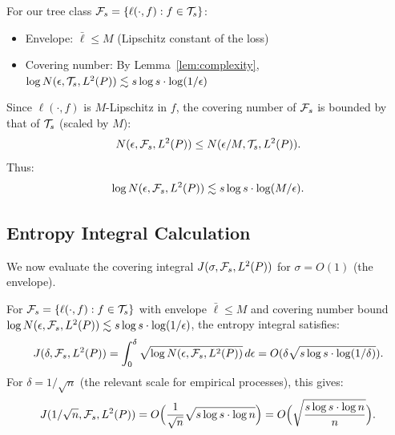 \documentclass[12pt]{article}
\begin{document}
For our tree class $\mathcal{F}_s = \{ \ell(\cdot, f) : f \in \mathcal{T}_s \}$:
\begin{itemize}
\item Envelope: $\bar{\ell} \le M$ (Lipschitz constant of the loss)
\item Covering number: By Lemma~\ref{lem:complexity}, $\log N(\epsilon, \mathcal{T}_s, L^2(P)) \lesssim s \log s \cdot \log(1/\epsilon)$
\end{itemize}

Since $\ell(\cdot, f)$ is $M$-Lipschitz in $f$, the covering number of $\mathcal{F}_s$ is bounded by that of $\mathcal{T}_s$ (scaled by $M$):
\[
N(\epsilon, \mathcal{F}_s, L^2(P)) \le N(\epsilon / M, \mathcal{T}_s, L^2(P)).
\]
Thus:
\[
\log N(\epsilon, \mathcal{F}_s, L^2(P)) \lesssim s \log s \cdot \log(M/\epsilon).
\]

\subsection{Entropy Integral Calculation}

We now evaluate the covering integral $J(\sigma, \mathcal{F}_s, L^2(P))$ for $\sigma = O(1)$ (the envelope).

\begin{lemma}
\label{lem:entropy-integral}
For $\mathcal{F}_s = \{ \ell(\cdot, f) : f \in \mathcal{T}_s \}$ with envelope $\bar{\ell} \le M$ and covering number bound $\log N(\epsilon, \mathcal{F}_s, L^2(P)) \lesssim s \log s \cdot \log(1/\epsilon)$, the entropy integral satisfies:
\[
J(\delta, \mathcal{F}_s, L^2(P)) = \int_0^\delta \sqrt{\log N(\epsilon, \mathcal{F}_s, L^2(P))} \, d\epsilon = O(\delta \sqrt{s \log s \cdot \log(1/\delta)}).
\]
For $\delta = 1/\sqrt{n}$ (the relevant scale for empirical processes), this gives:
\[
J(1/\sqrt{n}, \mathcal{F}_s, L^2(P)) = O\Bigl( \frac{1}{\sqrt{n}} \sqrt{s \log s \cdot \log n} \Bigr) = O\Bigl( \sqrt{\frac{s \log s \cdot \log n}{n}} \Bigr).
\]
\end{lemma}
\end{document}
